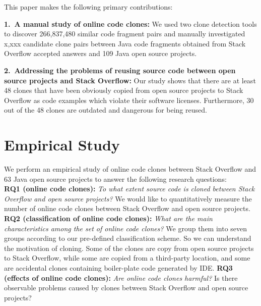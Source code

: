 \documentclass{sig-alternate-05-2015}
\begin{document}
This paper makes the following  primary contributions:

\vspace{0.5ex}%
\noindent\textbf{1.~A manual study of online code clones:} 
We used two clone detection tools to discover 266,837,480 similar code fragment pairs and manually investigated x,xxx candidate clone pairs between Java code fragments obtained from Stack Overflow accepted answers and 109 Java open source projects.

\vspace{0.5ex}%
\noindent\textbf{2.~Addressing the problems of reusing source code between open source projects and Stack Overflow:} Our study shows that there are at least 48 clones that have been obviously copied from open source projects to Stack Overflow as code examples which violate their software licenses. Furthermore, 30 out of the 48 clones are outdated and dangerous for being reused.

\section{Empirical Study}
We perform an empirical study of online code clones between Stack Overflow and 63 Java open source projects to answer the following research questions: \\ 
\textbf{RQ1 (online code clones):} \textit{To what extent  source code is cloned between Stack Overflow and open source projects?} We would like to quantitatively measure the number of online code clones between Stack Overflow and open source projects. \newline
\textbf{RQ2 (classification of online code clones):} \textit{What are the main characteristics among the set of online code clones?} We group them into seven groups according to our pre-defined classification scheme. So we can understand the motivation of cloning. Some of the clones are copy from open source projects to Stack Overflow, while some are copied from a third-party location, and some are accidental clones containing boiler-plate code generated by IDE. \newline
\textbf{RQ3 (effects of online code clones):} \textit{Are online code clones harmful?} Is there observable problems caused by clones between Stack Overflow and open source projects?
\end{document}
